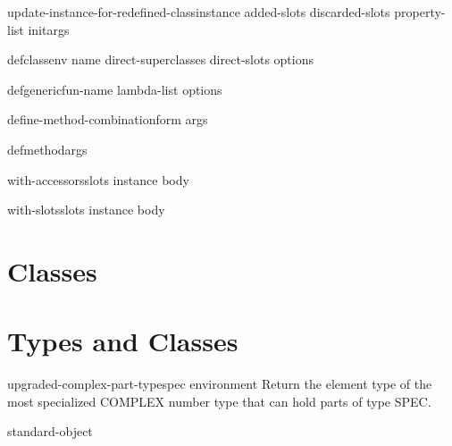\documentclass[10pt,english]{book}
\begin{document}
\begin{generic}{update-instance-for-redefined-class}{instance added-slots discarded-slots property-list \rest initargs}
  
\end{generic}

\begin{macro}{defclass}{\env env name direct-superclasses direct-slots \rest options}
  
\end{macro}

\begin{macro}{defgeneric}{fun-name lambda-list \body options}
  
\end{macro}

\begin{macro}{define-method-combination}{\whole form \rest args}
  
\end{macro}

\begin{macro}{defmethod}{\rest args}
  
\end{macro}

\begin{macro}{with-accessors}{slots instance \body body}
  
\end{macro}

\begin{macro}{with-slots}{slots instance \body body}
  
\end{macro}

\section{Classes}

\section{Types and Classes}

\begin{function}{upgraded-complex-part-type}{spec \op environment}
  Return the element type of the most specialized COMPLEX number type that
   can hold parts of type SPEC.
\end{function}

\begin{class}{standard-object}{}
  
\end{class}
\end{document}
